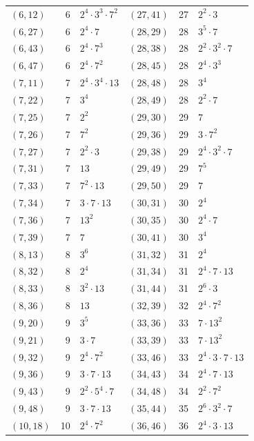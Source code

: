 \documentclass[11pt]{article}
\begin{document}
\begin{longtable}{@{}lrl@{\qquad}lrl@{}}
$(6,12)$ & 6 & $2^{4}\cdot 3^{3}\cdot 7^{2}$ & $(27,41)$ & 27 & $2^{2}\cdot 3$\\
$(6,27)$ & 6 & $2^{4}\cdot 7$ & $(28,29)$ & 28 & $3^{5}\cdot 7$\\
$(6,43)$ & 6 & $2^{4}\cdot 7^{3}$ & $(28,38)$ & 28 & $2^{2}\cdot 3^{2}\cdot 7$\\
$(6,47)$ & 6 & $2^{4}\cdot 7^{2}$ & $(28,45)$ & 28 & $2^{4}\cdot 3^{3}$\\
$(7,11)$ & 7 & $2^{4}\cdot 3^{4}\cdot 13$ & $(28,48)$ & 28 & $3^{4}$\\
$(7,22)$ & 7 & $3^{4}$ & $(28,49)$ & 28 & $2^{2}\cdot 7$\\
$(7,25)$ & 7 & $2^{2}$ & $(29,30)$ & 29 & $7$\\
$(7,26)$ & 7 & $7^{2}$ & $(29,36)$ & 29 & $3\cdot 7^{2}$\\
$(7,27)$ & 7 & $2^{2}\cdot 3$ & $(29,38)$ & 29 & $2^{4}\cdot 3^{2}\cdot 7$\\
$(7,31)$ & 7 & $13$ & $(29,49)$ & 29 & $7^{5}$\\
$(7,33)$ & 7 & $7^{2}\cdot 13$ & $(29,50)$ & 29 & $7$\\
$(7,34)$ & 7 & $3\cdot 7\cdot 13$ & $(30,31)$ & 30 & $2^{4}$\\
$(7,36)$ & 7 & $13^{2}$ & $(30,35)$ & 30 & $2^{4}\cdot 7$\\
$(7,39)$ & 7 & $7$ & $(30,41)$ & 30 & $3^{4}$\\
$(8,13)$ & 8 & $3^{6}$ & $(31,32)$ & 31 & $2^{4}$\\
$(8,32)$ & 8 & $2^{4}$ & $(31,34)$ & 31 & $2^{4}\cdot 7\cdot 13$\\
$(8,33)$ & 8 & $3^{2}\cdot 13$ & $(31,44)$ & 31 & $2^{6}\cdot 3$\\
$(8,36)$ & 8 & $13$ & $(32,39)$ & 32 & $2^{4}\cdot 7^{2}$\\
$(9,20)$ & 9 & $3^{5}$ & $(33,36)$ & 33 & $7\cdot 13^{2}$\\
$(9,21)$ & 9 & $3\cdot 7$ & $(33,39)$ & 33 & $7\cdot 13^{2}$\\
$(9,32)$ & 9 & $2^{4}\cdot 7^{2}$ & $(33,46)$ & 33 & $2^{4}\cdot 3\cdot 7\cdot 13$\\
$(9,36)$ & 9 & $3\cdot 7\cdot 13$ & $(34,43)$ & 34 & $2^{4}\cdot 7\cdot 13$\\
$(9,43)$ & 9 & $2^{2}\cdot 5^{4}\cdot 7$ & $(34,48)$ & 34 & $2^{2}\cdot 7^{2}$\\
$(9,48)$ & 9 & $3\cdot 7\cdot 13$ & $(35,44)$ & 35 & $2^{6}\cdot 3^{2}\cdot 7$\\
$(10,18)$ & 10 & $2^{4}\cdot 7^{2}$ & $(36,46)$ & 36 & $2^{4}\cdot 3\cdot 13$\\

\end{longtable}
\end{document}
